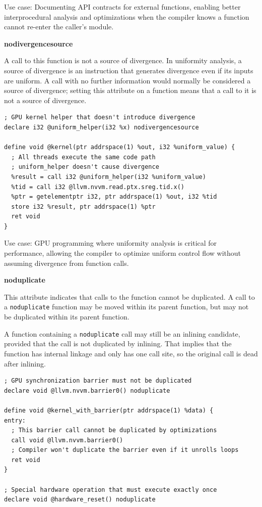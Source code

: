 Use case: Documenting API contracts for external functions, enabling better interprocedural analysis and optimizations when the compiler knows a function cannot re-enter the caller's module.

\textbf{nodivergencesource}

A call to this function is not a source of divergence.
In uniformity analysis, a source of divergence is an instruction that generates divergence even if its inputs are uniform.
A call with no further information would normally be considered a source of divergence; setting this attribute on a function means that a call to it is not a source of divergence.

\begin{lstlisting}[style=ir]
; GPU kernel helper that doesn't introduce divergence
declare i32 @uniform_helper(i32 %x) nodivergencesource

define void @kernel(ptr addrspace(1) %out, i32 %uniform_value) {
  ; All threads execute the same code path
  ; uniform_helper doesn't cause divergence
  %result = call i32 @uniform_helper(i32 %uniform_value)
  %tid = call i32 @llvm.nvvm.read.ptx.sreg.tid.x()
  %ptr = getelementptr i32, ptr addrspace(1) %out, i32 %tid
  store i32 %result, ptr addrspace(1) %ptr
  ret void
}
\end{lstlisting}

Use case: GPU programming where uniformity analysis is critical for performance, allowing the compiler to optimize uniform control flow without assuming divergence from function calls.

\textbf{noduplicate}

This attribute indicates that calls to the function cannot be duplicated.
A call to a \texttt{noduplicate} function may be moved within its parent function, but may not be duplicated within its parent function.

A function containing a \texttt{noduplicate} call may still be an inlining candidate, provided that the call is not duplicated by inlining.
That implies that the function has internal linkage and only has one call site, so the original call is dead after inlining.

\begin{lstlisting}[style=ir]
; GPU synchronization barrier must not be duplicated
declare void @llvm.nvvm.barrier0() noduplicate

define void @kernel_with_barrier(ptr addrspace(1) %data) {
entry:
  ; This barrier call cannot be duplicated by optimizations
  call void @llvm.nvvm.barrier0()
  ; Compiler won't duplicate the barrier even if it unrolls loops
  ret void
}

; Special hardware operation that must execute exactly once
declare void @hardware_reset() noduplicate
\end{lstlisting}

